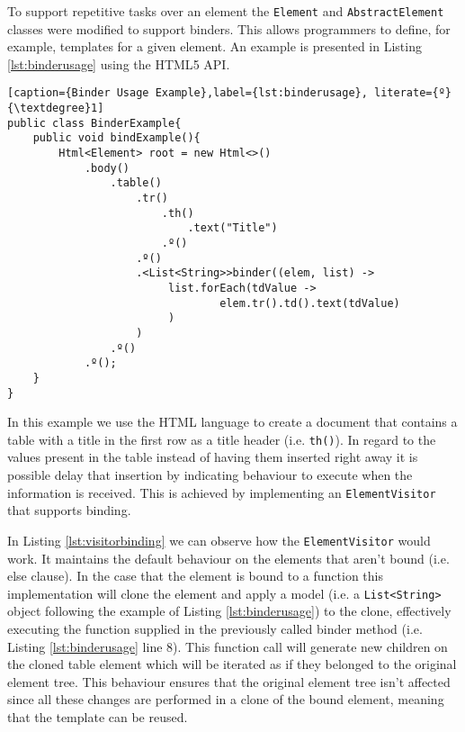 \noindent
To support repetitive tasks over an element the \texttt{Element} and \texttt{AbstractElement} classes were modified to support binders. This allows programmers to define, for example, templates for a given element. An example is presented in Listing \ref{lst:binderusage} using the \ac{HTML}5 \ac{API}.

\bigskip


\begin{minipage}{\linewidth}
\begin{lstlisting}[caption={Binder Usage Example},label={lst:binderusage}, literate={º}{\textdegree}1]
public class BinderExample{
    public void bindExample(){
		Html<Element> root = new Html<>()
            .body()
                .table()
                    .tr()
                        .th()
                            .text("Title")
                        .º()
                    .º()
                    .<List<String>>binder((elem, list) ->
                         list.forEach(tdValue ->
                                 elem.tr().td().text(tdValue)
                         )
                    )
                .º()
            .º();
    }
}
\end{lstlisting}
\end{minipage}

\noindent
In this example we use the \ac{HTML} language to create a document that contains a table with a title in the first row as a title header (i.e. \texttt{th()}). In regard to the values present in the table instead of having them inserted right away it is possible delay that insertion by indicating behaviour to execute when the information is received. This is achieved by implementing an \texttt{ElementVisitor} that supports binding. 

\noindent
In Listing \ref{lst:visitorbinding} we can observe how the \texttt{ElementVisitor} would work. It maintains the default behaviour on the elements that aren't bound (i.e. else clause). In the case that the element is bound to a function this implementation will clone the element and apply a model (i.e. a \texttt{List<String>} object following the example of Listing \ref{lst:binderusage}) to the clone, effectively executing the function supplied in the previously called binder method (i.e. Listing \ref{lst:binderusage} line 8). This function call will generate new children on the cloned table element which will be iterated as if they belonged to the original element tree. This behaviour ensures that the original element tree isn't affected since all these changes are performed in a clone of the bound element, meaning that the template can be reused.


